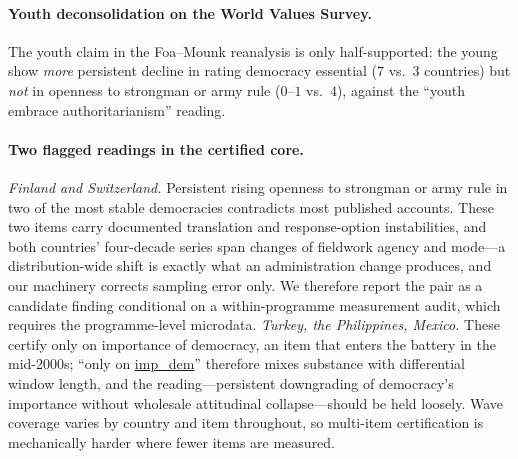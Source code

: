 \documentclass[12pt]{article}
\newcommand{\code}[1]{\begingroup\urlstyle{tt}\url{#1}\endgroup}
\theoremstyle{definition}
\theoremstyle{remark}
\begin{document}
\paragraph{Youth deconsolidation on the World Values Survey.} The youth claim in the
Foa--Mounk reanalysis is only half-supported: the young show \emph{more} persistent
decline in rating democracy essential ($7$ vs.\ $3$ countries) but \emph{not} in
openness to strongman or army rule ($0$--$1$ vs.\ $4$), against the ``youth embrace
authoritarianism'' reading.

\paragraph{Two flagged readings in the certified core.} \emph{Finland and
Switzerland.} Persistent rising openness to strongman or army rule in two of the
most stable democracies contradicts most published accounts. These two items
carry documented translation and response-option instabilities, and both
countries' four-decade series span changes of fieldwork agency and
mode---a distribution-wide shift is exactly what an administration change
produces, and our machinery corrects sampling error only. We therefore report the pair as a candidate
finding conditional on a within-programme measurement audit, which requires the
programme-level microdata. \emph{Turkey, the Philippines, Mexico.} These certify
only on importance of democracy, an item that enters the battery in the
mid-2000s; ``only on \code{imp_dem}'' therefore mixes substance with
differential window length, and the reading---persistent downgrading of
democracy's importance without wholesale attitudinal collapse---should be held
loosely. Wave coverage varies by country and item throughout, so multi-item
certification is mechanically harder where fewer items are measured.
\end{document}
